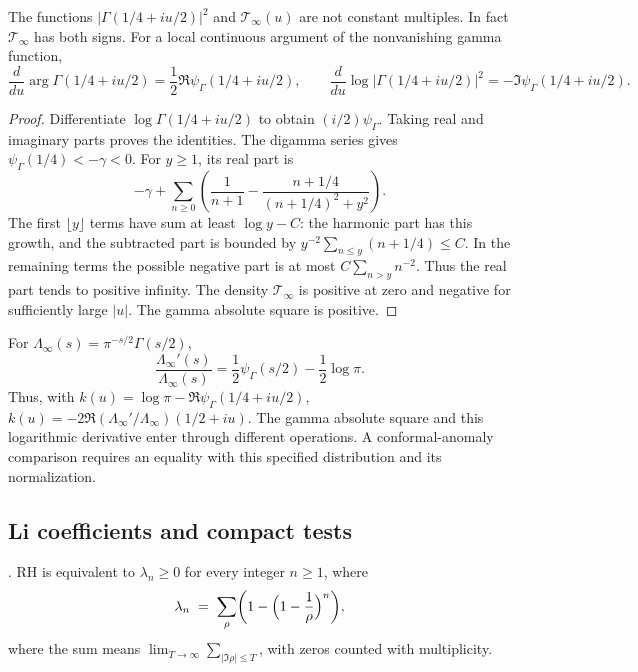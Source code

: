 \begin{proposition}
\label{v4-arith:w5-a:prop:archimedean-not-absorbed}
The functions $|\Gamma(1/4+iu/2)|^2$ and $\mathcal T_\infty(u)$
are not constant multiples. In fact $\mathcal T_\infty$ has both signs.
For a local continuous argument of the nonvanishing gamma function,
\[
 \frac{d}{du}\arg\Gamma(1/4+iu/2)=\frac12\Re\psi_\Gamma(1/4+iu/2),
 \qquad
 \frac{d}{du}\log|\Gamma(1/4+iu/2)|^2=-\Im\psi_\Gamma(1/4+iu/2).
\]
\end{proposition}
\begin{proof}
Differentiate $\log\Gamma(1/4+iu/2)$ to obtain $(i/2)\psi_\Gamma$.
Taking real and imaginary parts proves the identities.
The digamma series gives $\psi_\Gamma(1/4)<-\gamma<0$.
For $y\ge1$, its real part is
\[
 -\gamma+\sum_{n\ge0}
 \left(\frac1{n+1}-\frac{n+1/4}{(n+1/4)^2+y^2}\right).
\]
The first $\lfloor y\rfloor$ terms have sum at least $\log y-C$:
the harmonic part has this growth, and the subtracted part is bounded
by $y^{-2}\sum_{n\le y}(n+1/4)\le C$.
In the remaining terms the possible negative part is at most
$C\sum_{n>y}n^{-2}$. Thus the real part tends to positive infinity.
The density $\mathcal T_\infty$ is positive at zero and negative
for sufficiently large $|u|$. The gamma absolute square is positive.
\end{proof}

\begin{remark}
\label{v4-arith:w5-a:rem:archimedean-obstruction}
For \(\Lambda_\infty(s)=\pi^{-s/2}\Gamma(s/2)\),
\[
 \frac{\Lambda_\infty'(s)}{\Lambda_\infty(s)}
 =\frac12\psi_\Gamma(s/2)-\frac12\log\pi.
\]
Thus, with \(k(u)=\log\pi-\Re\psi_\Gamma(1/4+iu/2)\),
\(k(u)=-2\Re(\Lambda_\infty'/\Lambda_\infty)(1/2+iu)\).
The gamma absolute square and this logarithmic derivative enter
through different operations. A conformal-anomaly comparison requires
an equality with this specified distribution and its normalization.
\end{remark}

\subsection{Li coefficients and compact tests}
\label{v4-arith:w5-a:weil-explicit:Li}

\begin{theorem}
\label{v4-arith:w5-a:thm:li-criterion}
\ClaimStatusProvedElsewhere. RH is equivalent to \(\lambda_{n}\geq 0\)
for every integer \(n\geq 1\), where
\begin{equation}
\label{v4-arith:w5-a:eq:li}
\lambda_{n}\;=\;\sum_{\rho}\biggl(1-\Bigl(1-\frac{1}{\rho}\Bigr)^{n}\biggr),
\end{equation}
where the sum means \(\lim_{T\to\infty}\sum_{|\Im\rho|\le T}\),
with zeros counted with multiplicity.
\end{theorem}

